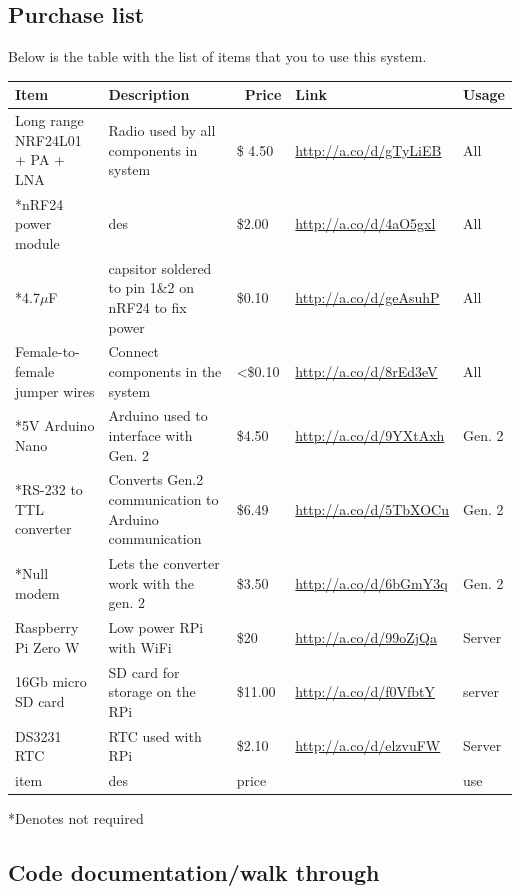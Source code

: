 \documentclass[12pt]{article}
\begin{document}
\subsection{Purchase list}
Below is the table with the list of items that you to use this system.
\begin{center}
\begin{tabularx}{\textwidth}{ |X|X|X|X|X| }
	\hline
	\textbf{Item} & \textbf{Description} & \textbf{~Price} & \textbf{Link} & \textbf{Usage}\\ 
	\hline
	Long range NRF24L01 + PA + LNA & Radio used by all components in system & \$ 4.50 & \url{http://a.co/d/gTyLiEB} & All \\ 
	\hline
	*nRF24 power module & des & \$2.00 & \url{http://a.co/d/4aO5gxl} & All \\ 
	\hline
	*4.7$\mu$F & capsitor soldered to pin 1\&2 on nRF24 to fix power & \$0.10 & \url{http://a.co/d/geAsuhP} & All \\ 
	\hline
	Female-to-female jumper wires & Connect components in the system & \textless\$0.10 & \url{http://a.co/d/8rEd3eV} & All \\ 
	\hline
	*5V Arduino Nano & Arduino used to interface with Gen. 2 & \$4.50 & \url{http://a.co/d/9YXtAxh} &  Gen. 2 \\ 
	\hline
	*RS-232 to TTL converter & Converts Gen.2 communication to Arduino communication & \$6.49 & \url{http://a.co/d/5TbXOCu} & Gen. 2 \\ 
	\hline
	*Null modem & Lets the converter work with the gen. 2 & \$3.50 & \url{http://a.co/d/6bGmY3q} & Gen. 2 \\ 
	\hline
	Raspberry Pi Zero W & Low power RPi with WiFi & \$20 & \url{http://a.co/d/99oZjQa} & Server \\ 
	\hline
	16Gb micro SD card & SD card for storage on the RPi & \$11.00 & \url{http://a.co/d/f0VfbtY} & server \\ 
	\hline
	DS3231 RTC & RTC used with RPi & \$2.10 & \url{http://a.co/d/elzvuFW} & Server \\ 
	\hline
	item & des & price & \url{} & use \\ 
	\hline
	
\end{tabularx}
*Denotes not required
\end{center}

\subsection{Code documentation/walk through}
\end{document}

